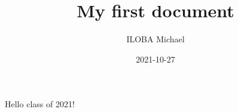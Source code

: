 \documentclass{article}
\title{My first document}
\date{2021-10-27}
\author{ILOBA Michael}
\begin{document}
	\maketitle
	\newpage
	Hello class of 2021!
  
\end{document}
